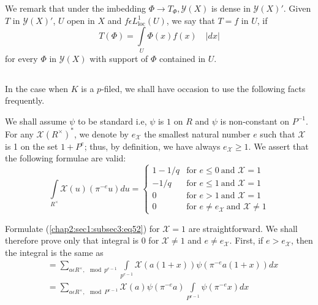  We remark that under the imbedding $\Phi\rightarrow
 T_{\Phi},\mathscr{Y}(X)$ is dense in $\mathscr{Y}(X)'$. Given $T$ in
 $\mathscr{Y}(X)'$, $U$ open in $X$ and $f\epsilon
 L_{\text{loc}}^{1}(U)$, we say that $T=f$ in $U$, if 
\begin{equation*}
  T(\Phi)=\int\limits_{U}\Phi(x)f(x)\quad|dx|
  \tag{51}\label{chap2:sec1:subsec2:eq51}
\end{equation*}
 for every $\Phi$ in $\mathscr{Y}(X)$ with support of $\Phi$ contained
 in $U$. 

\subsection{}\label{chap2:sec1:subsec3} %

In the case when $K$ is a $p$-filed, we shall have occasion to use the
following facts frequently. 

 We shall assume $\psi$ to be standard i.e, $\psi$ is $1$ on $R$ and
 $\psi$ is non-constant on $P^{-1}$. For any
 $\mathcal{X}(R^{\times})^{\ast}$, we denote by $e_{\mathcal{X}}$ the
 smallest natural number $e$ such that $\mathcal{X}$ is 1 on the set
 $1+P^{e}$; thus, by definition, we have always $e_{\mathcal{X}}\ge
 1$. We assert that the following formulae are valid: 
\begin{equation*}
  \int\limits_{R^{\times}}\mathcal{X}(u)(\pi^{-e}u)du =
  \begin{cases}
    1-1/q &\text{for } e\le 0 ~\text{and } \mathcal{X}=1 \\
    -1/q &\text{for } e\le 1 ~\text{and }\mathcal{X}=1 \\
    0 &\text{for } e>1 ~\text{and }\mathcal{X}=1\\
    0 &\text{for } e\neq e_{\mathcal{X}} ~\text{and } \mathcal{X}\neq 1
  \end{cases}\tag{52}\label{chap2:sec1:subsec3:eq52}
\end{equation*}

 Formulate (\ref{chap2:sec1:subsec3:eq52}) for $\mathcal{X}=1$ are straightforward. We shall
 therefore prove only that integral is $0$ for $\mathcal{X}\neq 1$ and
 $e\neq e_{\mathcal{X}}$. First, if $e>e_{\mathcal{X}}$, then the
 integral is the same as 
\begin{align*}
  & =\sum_{a\epsilon R^{\times}, \mod p^{e-1}} \int\limits_{p^{e-1}}
  \mathcal{X}(a(1+x))\psi(\pi^{-e}a(1+x))dx\\
  & =\sum_{a\epsilon R^{\times}, \mod P^{e-1}} \mathcal{X}(a) 
  \psi(\pi^{-e}a)\int\limits_{P^{e-1}}\psi(\pi^{-e}x)dx
\end{align*}

